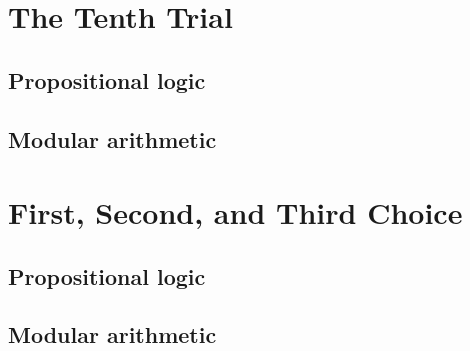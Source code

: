 

\section{The Tenth Trial} 

\subsection{Propositional logic}

 
\subsection{Modular arithmetic}



\section{First, Second, and Third Choice} 

\subsection{Propositional logic}

 
\subsection{Modular arithmetic}


